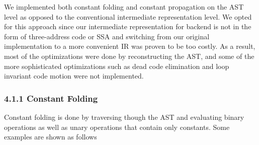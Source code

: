 \documentclass[10pt,a4paper]{report}
\newenvironment{tabularverbatim}
 {\VerbatimEnvironment
  \begin{BVerbatim}[baseline=c,formatcom=\setlength{\baselineskip}{\normalbaselineskip}]}
 {\end{BVerbatim}}
\begin{document}
  We implemented both constant folding and constant propagation on the AST level
  as opposed to the conventional intermediate representation level. We opted for
  this approach since our intermediate representation for backend is not in the
  form of three-address code or SSA and switching from our original
  implementation to a more convenient IR was proven to be too costly. As a
  result, most of the optimizations were done by reconstructing the AST, and
  some of the more sophisticated optimizations such as dead code elimination and
  loop invariant code motion were not implemented.

  \subsubsection*{4.1.1 Constant Folding}
  Constant folding is done by traversing though the AST and evaluating binary
  operations as well as unary operations that contain only constants. Some
  examples are shown as follows

  \begin{center}
  \end{center}
\end{document}
